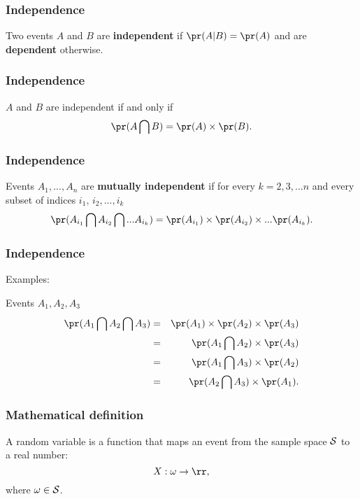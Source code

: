 \begin{frame}[fragile]\frametitle{Independence}

\begin{defn}

Two events $A$ and $B$ are {\bf independent} if $\pr(A|B) = \pr(A)$ and
are {\bf dependent} otherwise.
\end{defn}

\end{frame}


\begin{frame}[fragile]\frametitle{Independence}

\begin{prop}
$A$ and $B$ are independent if and only if
$$\pr(A \bigcap B) = \pr(A) \times \pr(B).$$
\end{prop}

\end{frame}

\begin{frame}[fragile]\frametitle{Independence}

\begin{defn}
Events $A_1,...,A_n$ are {\bf mutually independent} if for every 
$k=2,3,...n$ and every subset of indices $i_1, \,i_2,...,i_k$
$$\pr(A_{i_1} \bigcap A_{i_2} \bigcap ... A_{i_k}) = \pr(A_{i_1})
\times \pr(A_{i_2}) \times ... \pr(A_{i_k}).$$
\end{defn}

\end{frame}


\begin{frame}[fragile]\frametitle{Independence}

Examples:

Events $A_1, A_2, A_3$ 
\begin{eqnarray*}
\pr(A_1 \bigcap A_2 \bigcap A_3) &= & \pr(A_1) \times \pr(A_2) \times
\pr(A_3) \\  
 &= & \pr(A_1 \bigcap A_2) \times \pr(A_3) \\ 
 &= & \pr(A_1 \bigcap A_3) \times \pr(A_2) \\ 
 &= & \pr(A_2 \bigcap A_3) \times \pr(A_1). 
\end{eqnarray*}
\end{frame}

\begin{frame}[fragile]\frametitle{Mathematical definition}

\begin{defn}
A random variable is a function that maps an event from the
sample space $\cal S$ to a real number:
$$X: \omega \rightarrow \rr,$$
where $\omega \in {\cal S}$.
\end{defn}

\end{frame}



